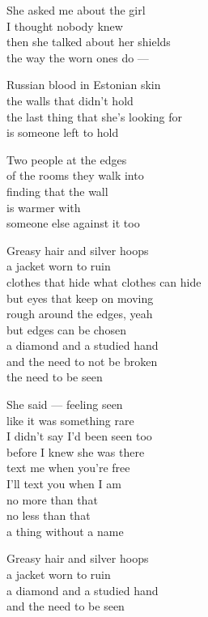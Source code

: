 \begin{lyrics}
She asked me about the girl\\
I thought nobody knew\\
then she talked about her shields\\
the way the worn ones do —

Russian blood in Estonian skin\\
the walls that didn't hold\\
the last thing that she's looking for\\
is someone left to hold

Two people at the edges\\
of the rooms they walk into\\
finding that the wall\\
is warmer with\\
someone else against it too

Greasy hair and silver hoops\\
a jacket worn to ruin\\
clothes that hide what clothes can hide\\
but eyes that keep on moving\\
rough around the edges, yeah\\
but edges can be chosen\\
a diamond and a studied hand\\
and the need to not be broken\\
the need to be seen

She said — feeling seen\\
like it was something rare\\
I didn't say I'd been seen too\\
before I knew she was there\\
text me when you're free\\
I'll text you when I am\\
no more than that\\
no less than that\\
a thing without a name

Greasy hair and silver hoops\\
a jacket worn to ruin\\
a diamond and a studied hand\\
and the need to be seen
\end{lyrics}


